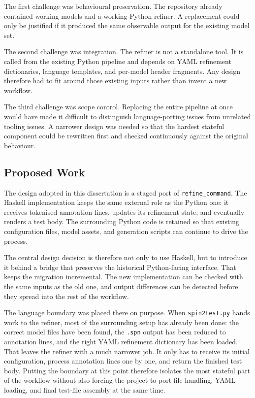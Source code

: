 The first challenge was behavioural preservation. The repository
already contained working models and a working Python refiner. A
replacement could only be justified if it produced the same observable
output for the existing model set.

The second challenge was integration. The refiner is not a standalone
tool. It is called from the existing Python pipeline and depends on
YAML refinement dictionaries, language templates, and per-model header
fragments. Any design therefore had to fit around those existing
inputs rather than invent a new workflow.

The third challenge was scope control. Replacing the entire pipeline
at once would have made it difficult to distinguish language-porting
issues from unrelated tooling issues. A narrower design was needed so
that the hardest stateful component could be rewritten first and
checked continuously against the original behaviour.

\subsection{Proposed Work}

The design adopted in this dissertation is a staged port of
\texttt{refine\_command}. The Haskell implementation keeps the same
external role as the Python one: it receives tokenised annotation
lines, updates its refinement state, and eventually renders a test
body. The surrounding Python code is retained so that existing
configuration files, model assets, and generation scripts can continue
to drive the process.

The central design decision is therefore not only to use Haskell, but
to introduce it behind a bridge that preserves the historical
Python-facing interface. That keeps the migration incremental. The new
implementation can be checked with the same inputs as the old one, and
output differences can be detected before they spread into the rest of
the workflow.

The language boundary was placed there on purpose. When
\texttt{spin2test.py} hands work to the refiner, most of the
surrounding setup has already been done: the correct model files have
been found, the \texttt{.spn} output has been reduced to annotation
lines, and the right YAML refinement dictionary has been loaded. That
leaves the refiner with a much narrower job. It only has to receive
its initial configuration, process annotation lines one by one, and
return the finished test body. Putting the boundary at this point
therefore isolates the most stateful part of the workflow without also
forcing the project to port file handling, YAML loading, and final
test-file assembly at the same time.

